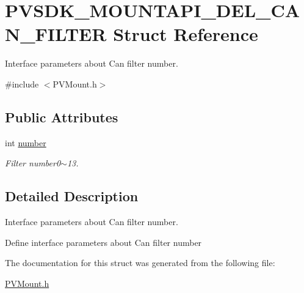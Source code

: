 \hypertarget{struct_p_v_s_d_k___m_o_u_n_t_a_p_i___d_e_l___c_a_n___f_i_l_t_e_r}{}\section{P\+V\+S\+D\+K\+\_\+\+M\+O\+U\+N\+T\+A\+P\+I\+\_\+\+D\+E\+L\+\_\+\+C\+A\+N\+\_\+\+F\+I\+L\+T\+ER Struct Reference}
\label{struct_p_v_s_d_k___m_o_u_n_t_a_p_i___d_e_l___c_a_n___f_i_l_t_e_r}


Interface parameters about Can filter number.  




{\ttfamily \#include $<$P\+V\+Mount.\+h$>$}

\subsection*{Public Attributes}
\begin{DoxyCompactItemize}
\item 
\mbox{\label{struct_p_v_s_d_k___m_o_u_n_t_a_p_i___d_e_l___c_a_n___f_i_l_t_e_r_a152679952f37646ab0ed152d29f2e61c}} 
int \hyperlink{struct_p_v_s_d_k___m_o_u_n_t_a_p_i___d_e_l___c_a_n___f_i_l_t_e_r_a152679952f37646ab0ed152d29f2e61c}{number}
\begin{DoxyCompactList}\small\item\em Filter number0$\sim$13. \end{DoxyCompactList}\end{DoxyCompactItemize}


\subsection{Detailed Description}
Interface parameters about Can filter number. 

Define interface parameters about Can filter number 

The documentation for this struct was generated from the following file\+:\begin{DoxyCompactItemize}
\item 
\hyperlink{_p_v_mount_8h}{P\+V\+Mount.\+h}\end{DoxyCompactItemize}
